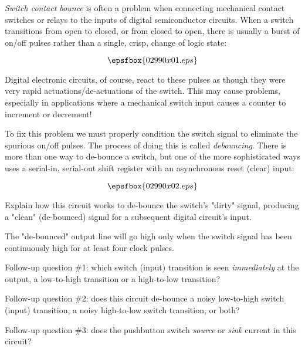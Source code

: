 

{\it Switch contact bounce} is often a problem when connecting mechanical contact switches or relays to the inputs of digital semiconductor circuits.  When a switch transitions from open to closed, or from closed to open, there is usually a burst of on/off pulses rather than a single, crisp, change of logic state:

$$\epsfbox{02990x01.eps}$$

Digital electronic circuits, of course, react to these pulses as though they were very rapid actuations/de-actuations of the switch.  This may cause problems, especially in applications where a mechanical switch input causes a counter to increment or decrement!

To fix this problem we must properly condition the switch signal to eliminate the spurious on/off pulses.  The process of doing this is called {\it debouncing}.  There is more than one way to de-bounce a switch, but one of the more sophisticated ways uses a serial-in, serial-out shift register with an asynchronous reset (clear) input:

$$\epsfbox{02990x02.eps}$$

Explain how this circuit works to de-bounce the switch's "dirty" signal, producing a "clean" (de-bounced) signal for a subsequent digital circuit's input.







The "de-bounced" output line will go high only when the switch signal has been continuously high for at least four clock pulses.

\vskip 10pt

Follow-up question \#1: which switch (input) transition is seen {\it immediately} at the output, a low-to-high transition or a high-to-low transition?

\vskip 10pt

Follow-up question \#2: does this circuit de-bounce a noisy low-to-high switch (input) transition, a noisy high-to-low switch transition, or both?

\vskip 10pt

Follow-up question \#3: does the pushbutton switch {\it source} or {\it sink} current in this circuit?

